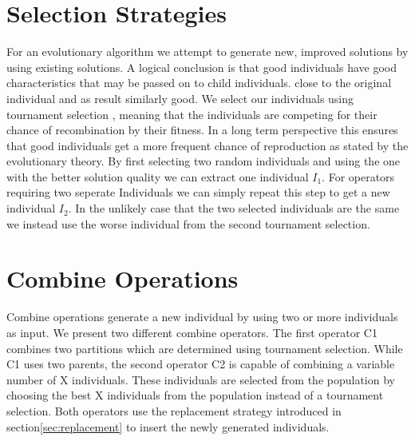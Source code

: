\documentclass[a4paper,12pt,titlepage, BCOR7mm,headsepline]{scrbook}
\numberwithin{equation}{section}
\begin{document}
\section{Selection Strategies}
For an evolutionary algorithm we attempt to generate new, improved solutions by using existing solutions. A logical conclusion is that good individuals have good characteristics that may be passed on to child individuals.
close to the original individual and as result similarly good. We select our individuals using tournament selection \cite{blickle1996comparison}, meaning that the individuals are competing for their chance of recombination by their fitness. In a long term perspective this ensures that good individuals get a more frequent chance of reproduction as stated by the evolutionary theory.  By first selecting two random individuals and using the one with the better solution quality we can extract one individual $I_1$. For operators requiring two seperate Individuals we can simply repeat this step to get a new individual $I_2$. In the unlikely case that the two selected individuals are the same we instead use the worse individual from the second tournament selection.
\section{Combine Operations}
Combine operations generate a new individual by using two or more individuals as input. We present two different combine operators. The first operator C1 combines two partitions which are determined using tournament selection. While C1 uses two parents, the second operator C2 is capable of combining a variable number of X individuals. These individuals are selected from the population by choosing the best X individuals from the population instead of a tournament selection. Both operators use the replacement strategy introduced in section\ref{sec:replacement} to insert the newly generated individuals.
\end{document}

